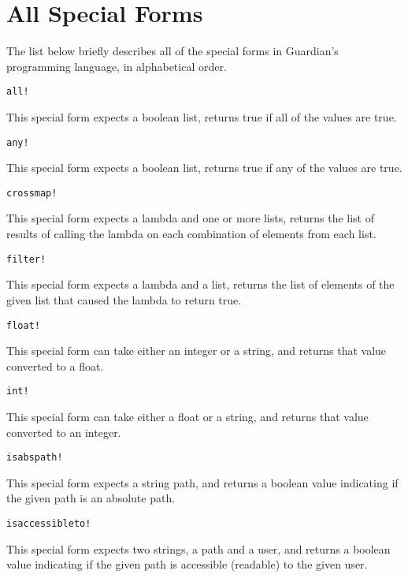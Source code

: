 
\section{All Special Forms}
{
	The list below briefly describes all of the special forms in Guardian's
	programming language, in alphabetical order.
	
	\begin{itemize}
	{
		\item[] \texttt{all!}
			
			This special form expects a boolean list, returns true if all of the values
			are true.
			
		\item[] \texttt{any!}
		
			This special form expects a boolean list, returns true if any of the values
			are true.
		
		\item[] \texttt{crossmap!}
		
			This special form expects a lambda and one or more lists, returns
			the list of results of calling the lambda on each combination
			of elements from each list.
		
		\item[] \texttt{filter!}
		
			This special form expects a lambda and a list, returns the list
			of elements of the given list that caused the lambda to return true.
		
		\item[] \texttt{float!}
		
			This special form can take either an integer or a string, and
			returns that value converted to a float.
		
		\item[] \texttt{int!}
		
			This special form can take either a float or a string, and
			returns that value converted to an integer.
		
		\item[] \texttt{isabspath!}
		
			This special form expects a string path, and returns
			a boolean value indicating if the given path is an absolute path.
		
		\item[] \texttt{isaccessibleto!}
		
			This special form expects two strings, a path and a user, and
			returns a boolean value indicating if the given path is
			accessible (readable) to the given user.
		
}
\end{itemize}}
